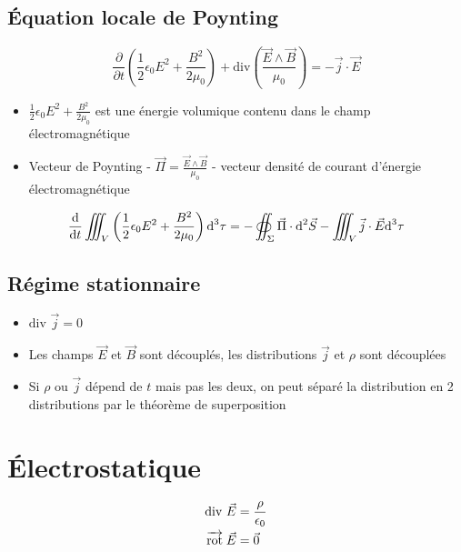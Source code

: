 \documentclass[openany]{book}
\begin{document}
\subsection{Équation locale de Poynting}

\[ \frac{\partial}{\partial t} \left( \frac{1}{2}\epsilon_0 E^2 + \frac{B^2}{2\mu_0} \right) + \text{div}\left( \frac{\vec{E} \wedge \vec{B}}{\mu_0} \right) = - \vec{j} \cdot \vec{E} \]

\begin{itemize}
    \item $\frac{1}{2}\epsilon_0 E^2 + \frac{B^2}{2\mu_0} $ est une énergie volumique contenu dans le champ électromagnétique
    \item Vecteur de Poynting - $\vec{\Pi} = \frac{\vec{E} \wedge \vec{B}}{\mu_0}$ - vecteur densité de courant d'énergie électromagnétique
\end{itemize}

\[ \frac{\text{d}}{\text{d}t} \iiint_V \left(\frac{1}{2}\epsilon_0E^2 + \frac{B^2}{2\mu_0}\right) \text{d}^3 \tau = - \oiint_{\Sigma} \vec{\Pi} \cdot \text{d}^2 \vec{S} - \iiint_V \vec{j} \cdot \vec{E} \text{d}^3 \tau \]

\subsection{Régime stationnaire}
\begin{itemize}
    \item $\text{div } \vec{j} = 0$
    \item Les champs $\vec{E}$ et $\vec{B}$ sont découplés, les distributions $\vec{j}$ et $\rho$ sont découplées
    \item Si $\rho$ ou $\vec{j}$ dépend de $t$ mais pas les deux, on peut séparé la distribution en 2 distributions par le théorème de superposition
\end{itemize}

\section{Électrostatique}

\begin{align*}
    \text{div } \vec{E} &= \frac{\rho}{\epsilon_0} \\
    \overrightarrow{\text{rot}} \; \vec{E} &= \vec{0}
\end{align*}
\end{document}
